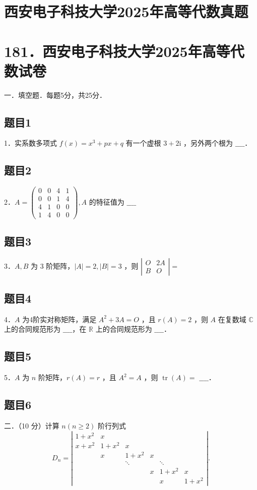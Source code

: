 \documentclass{article}
\begin{document}
\section*{西安电子科技大学2025年高等代数真题}
\section*{181．西安电子科技大学2025年高等代数试卷}

一．填空题．每题5分，共25分．

\subsection{题目1}
1．实系数多项式 \(f(x)=x^{3}+p x+q\) 有一个虚根 \(3+2 \mathrm{i}\) ，另外两个根为 \(\_\_\_\_\)．

\subsection{题目2}
2．\(A=\left(\begin{array}{llll}0 & 0 & 4 & 1 \\ 0 & 0 & 1 & 4 \\ 4 & 1 & 0 & 0 \\ 1 & 4 & 0 & 0\end{array}\right), A\) 的特征值为 \(\_\_\_\_\)

\subsection{题目3}
3．\(A, B\) 为 3 阶矩阵，\(|A|=2,|B|=3\) ，则 \(\left|\begin{array}{cc}O & 2 A \\ B & O\end{array}\right|=\)

\subsection{题目4}
4．\(A\) 为4阶实对称矩阵，满足 \(A^{2}+3 A=O\) ，且 \(r(A)=2\) ，则 \(A\) 在复数域 \(\mathbb{C}\) 上的合同规范形为
\(\_\_\_\_\)，在 \(\mathbb{R}\) 上的合同规范形为 \(\_\_\_\_\)．

\subsection{题目5}
5．\(A\) 为 \(n\) 阶矩阵，\(r(A)=r\) ，且 \(A^{2}=A\) ，则 \(\operatorname{tr}(A)=\) \(\_\_\_\_\)．

\subsection{题目6}
二．（10 分）计算 \(n(n \geq 2)\) 阶行列式
\[
D_{n}=\left|\begin{array}{cccccc}
1+x^{2} & x & & & & \\
x+x^{2} & 1+x^{2} & x & & & \\
& x & 1+x^{2} & x & & \\
& & \ddots & & \ddots & \\
& & & x & 1+x^{2} & x \\
& & & & x & 1+x^{2}
\end{array}\right| .
\]
\end{document}
